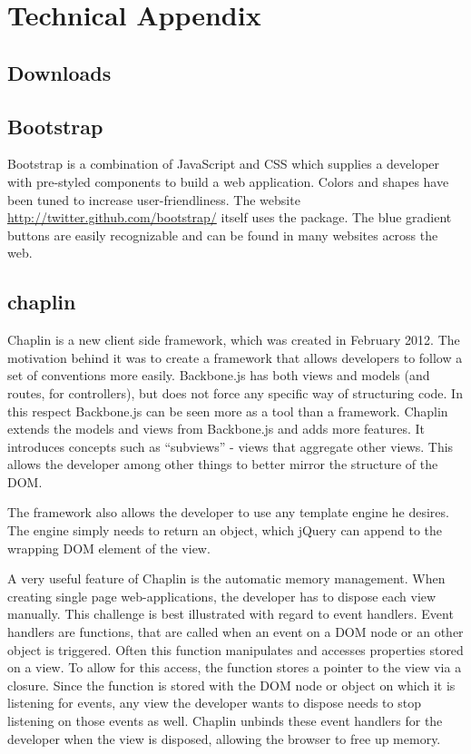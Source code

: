 \documentclass[thesis.tex]{subfiles}
\begin{document}
\chapter{Technical Appendix}

\section{Downloads}


\section{Bootstrap}
\label{sec:bootstrap}
Bootstrap is a combination of JavaScript and CSS which supplies a developer
with pre-styled components to build a web application. Colors and shapes
have been tuned to increase user-friendliness.
The website \url{http://twitter.github.com/bootstrap/} itself uses the package.
The blue gradient buttons are easily recognizable and can be found in many
websites across the web.

\section{chaplin}
\label{sec:chaplin}

Chaplin is a new client side framework, which was created in February 2012.
The motivation behind it was to create a framework that allows developers to
follow a set of conventions more easily. Backbone.js has both views and models
(and routes, for controllers), but does not force any specific way of
structuring code. In this respect Backbone.js can be seen more as a tool than a
framework.
Chaplin extends the models and views from Backbone.js and adds more features.
It introduces concepts such as ``subviews'' - views that aggregate other views.
This allows the developer among other things to better mirror the structure of
the DOM.

The framework also allows the developer to use any template engine he desires.
The engine simply needs to return an object, which jQuery can append to the
wrapping DOM element of the view.

A very useful feature of Chaplin is the automatic memory management.
When creating single page web-applications, the developer has to dispose each
view manually. This challenge is best illustrated with regard to event handlers.
Event handlers are functions, that are called when an event on a DOM node or
an other object is triggered. Often this function manipulates and accesses
properties stored on a view. To allow for this access, the function stores a
pointer to the view via a closure. Since the function is stored with the
DOM node or object on which it is listening for events, any view the developer
wants to dispose needs to stop listening on those events as well.
Chaplin unbinds these event handlers for the developer when the view is
disposed, allowing the browser to free up memory.
\end{document}

